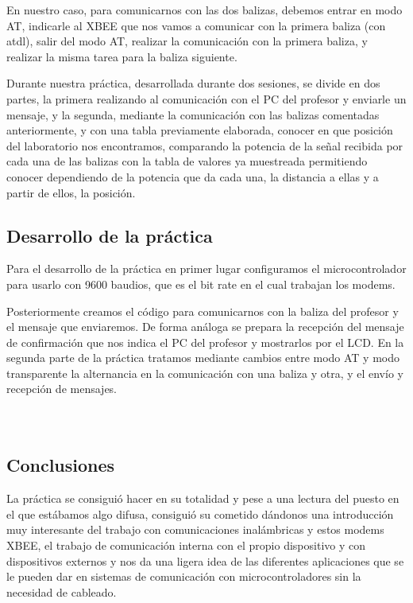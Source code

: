 \documentclass[a4paper, 11pt]{article}
\begin{document}
En nuestro caso, para comunicarnos con las dos balizas, debemos
entrar en modo AT, indicarle al XBEE que nos vamos a comunicar con
la primera baliza (con atdl), salir del modo AT, realizar la
comunicación con la primera baliza, y realizar la misma tarea para
la baliza siguiente.

Durante nuestra práctica, desarrollada durante dos sesiones, se
divide en dos partes, la primera realizando al comunicación con el
PC del profesor y enviarle un mensaje, y la segunda, mediante la
comunicación con las balizas comentadas anteriormente, y con una
tabla previamente elaborada, conocer en que posición del
laboratorio nos encontramos, comparando la potencia de la señal
recibida por cada una de las balizas con la tabla de valores ya
muestreada permitiendo conocer dependiendo de la potencia que da
cada una, la distancia a ellas y a partir de ellos, la posición.

\subsection{Desarrollo de la práctica}
Para el desarrollo de la práctica en primer lugar configuramos el
microcontrolador para usarlo con 9600 baudios, que es el bit rate
en el cual trabajan los modems.

Posteriormente creamos el código para comunicarnos con la baliza
del profesor y el mensaje que enviaremos. De forma análoga se
prepara la recepción del mensaje de confirmación que nos indica
el PC del profesor y mostrarlos por el LCD.  En la segunda parte
de la práctica tratamos mediante cambios entre modo AT y modo
transparente la alternancia en la comunicación con una baliza y
otra, y   el envío y recepción de mensajes.

\inputminted[tabsize=3, fontsize=\small]{c}{prac5-config.c}
\inputminted[tabsize=4, fontsize=\small]{c}{prac5-main1.c}
\inputminted[tabsize=4, fontsize=\small]{c}{prac5-main2.c}

\subsection{Conclusiones}
La práctica se consiguió hacer en su totalidad y pese a una
lectura del puesto en el que estábamos algo difusa, consiguió su
cometido dándonos una introducción muy interesante del trabajo
con comunicaciones inalámbricas y estos modems XBEE, el trabajo
de comunicación interna con el propio dispositivo y con
dispositivos externos y nos da una ligera idea de las diferentes
aplicaciones que se le pueden dar en sistemas de comunicación con
microcontroladores sin la necesidad de cableado.
\end{document}
